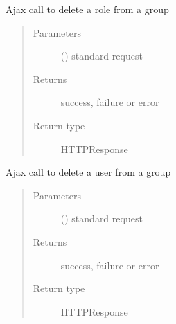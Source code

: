 \documentclass[letterpaper,10pt,english]{sphinxmanual}
\begin{document}

\begin{fulllineitems}
\label{\detokenize{rbac:rbac.ajax.rbac_delete_role_from_group_ajax}}
Ajax call to delete a role from a group
\begin{quote}\begin{description}
\item[{Parameters}] \leavevmode
{} () \textendash{} standard request

\item[{Returns}] \leavevmode
success, failure or error

\item[{Return type}] \leavevmode
HTTPResponse

\end{description}\end{quote}

\end{fulllineitems}


\begin{fulllineitems}
\label{\detokenize{rbac:rbac.ajax.rbac_delete_user_from_group_ajax}}
Ajax call to delete a user from a group
\begin{quote}\begin{description}
\item[{Parameters}] \leavevmode
{} () \textendash{} standard request

\item[{Returns}] \leavevmode
success, failure or error

\item[{Return type}] \leavevmode
HTTPResponse

\end{description}\end{quote}

\end{fulllineitems}
\end{document}
